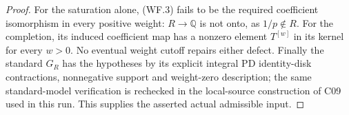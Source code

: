 \begin{proof}
For the saturation alone, (WF.3) fails to be the required
coefficient isomorphism in every positive weight: $R\to\mathbb Q$
is not onto, as $1/p\notin R$.
For the completion, its induced coefficient map has a
nonzero element $T^{[w]}$ in its kernel for every $w>0$.
No eventual weight cutoff repairs either defect.
Finally the standard $G_R$ has the hypotheses by its
explicit integral PD identity-disk contractions,
nonnegative support and weight-zero description; the
same standard-model verification is rechecked in the
local-source construction of C09 used in this run.
This supplies the asserted actual admissible input.
\end{proof}
